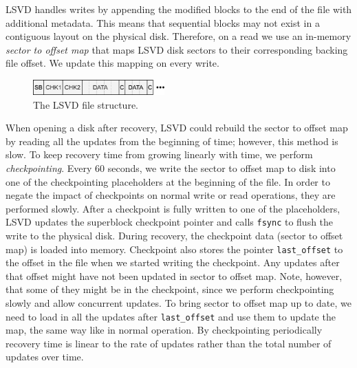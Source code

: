 LSVD handles writes by appending the modified blocks to the end of the file with additional metadata. This means that sequential blocks may not exist in a contiguous layout on the physical disk. Therefore, on a read we use an in-memory \emph{sector to offset map} that maps LSVD disk sectors to their corresponding backing file offset. We update this mapping on every write.


\begin{figure}[h]
    \includegraphics[width=0.45\textwidth]{./figures/lsvd.pdf}
    \caption{The LSVD file structure.}
    \label{fig:lsvd}
\end{figure}

When opening a disk after recovery, LSVD could rebuild the sector to offset map by reading all the updates from the beginning of time; however, this method is slow. To keep recovery time from growing linearly with time, we perform \emph{checkpointing}. Every 60 seconds, we write the sector to offset map to disk into one of the checkpointing placeholders at the beginning of the file. In order to negate the impact of checkpoints on normal write or read operations, they are performed slowly. After a checkpoint is fully written to one of the placeholders, LSVD updates the superblock checkpoint pointer and calls \texttt{fsync} to flush the write to the physical disk. During recovery, the checkpoint data (sector to offset map) is loaded into memory. Checkpoint also stores the pointer \texttt{last\_offset} to the offset in the file when we started writing the checkpoint. Any updates after that offset might have not been updated in sector to offset map. Note, however, that some of they might be in the checkpoint, since we perform checkpointing slowly and allow concurrent updates. To bring sector to offset map up to date, we need to load in all the updates after \texttt{last\_offset} and use them to update the map, the same way like in normal operation. By checkpointing periodically recovery time is linear to the rate of updates rather than the total number of updates over time.

